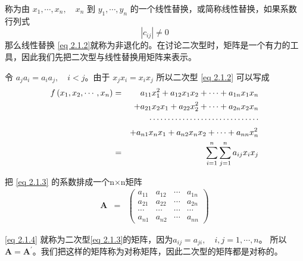 \begin{enumerate}[ 1) ]
		称为由  $ x_{1}, \cdots, x_{n}, \quad x_{n} $ 到 $  y_{1}, \cdots, y_{n}  $
		的一个线性替换，或简称线性替换，如果系数行列式
		\vspace{-1em}
		$$ \left|c_{i j}\right| \neq 0 $$
		那么线性替换 \eqref{eq 2.1.2}就称为非退化的。在讨论二次型时，矩阵是一个有力的工具，因此我们先把二次型与线性替换用矩阵来表示。
		
        令 $ a_{j} a_{i} = a_{i} a_{j} , \quad i <j$。由于 $ x_{j} x_{i} = x_{i} x_{j} $ 所以二次型
        \eqref{eq 2.1.2}
        	可以写成
        	 \begin{eqnarray}
	        		f\left(x_{1}, x_{2}, \cdots, x_{n}\right)  & =  & a_{11} x_{1}^{2}+a_{12} x_{1} x_{2}+\cdots+a_{1 n} x_{1} x_{n} \notag  \\
	        		&   & +a_{21} x_{2} x_{1}+a_{22} x_{2}^{2}+\cdots+a_{2 n} x_{2} x_{n} \notag \notag \\
	        		&   & \cdots \cdots \cdots \cdots \cdots \cdots\cdots \cdots \cdots \cdots \label{eq 2.1.3}  \\
	        		&   &  +a_{n 1} x_{n} x_{1}+a_{n 2} x_{n} x_{2}+\cdots+a_{n n} x_{n}^{2} \notag \\ 
	        		& = & \sum_{i  =  1}^{n} \sum_{j  =  1}^{n} a_{i j} x_{i}x_{j} \notag
			\end{eqnarray}
			
        把 \eqref{eq 2.1.3} 的系数排成一个n×n矩阵	
       \begin{eqnarray}
		\boldsymbol{A} & = & \left(
			\begin{array}{llll}
					a_{11} & a_{12} & \cdots & a_{1 n} \\
					a_{21} & a_{22} & \cdots & a_{2 n} \\
					\cdots & \cdots & \cdots & \cdots \\
					a_{n 1} & a_{n 2} & \cdots & a_{n n}
	       \end{array}\right)
	   \label{eq 2.1.4}
       \end{eqnarray}
       
       \eqref{eq 2.1.4} 就称为二次型\eqref{eq 2.1.3}的矩阵，因为$ a_{i j}  =  a_{j i}, \quad i, j  =  1, \cdots, n $。
       所以$ \boldsymbol{A} = \boldsymbol{A^{\prime}} $。我们把这样的矩阵称为对称矩阵，因此二次型的矩阵都是对称的。
       

\end{enumerate}
